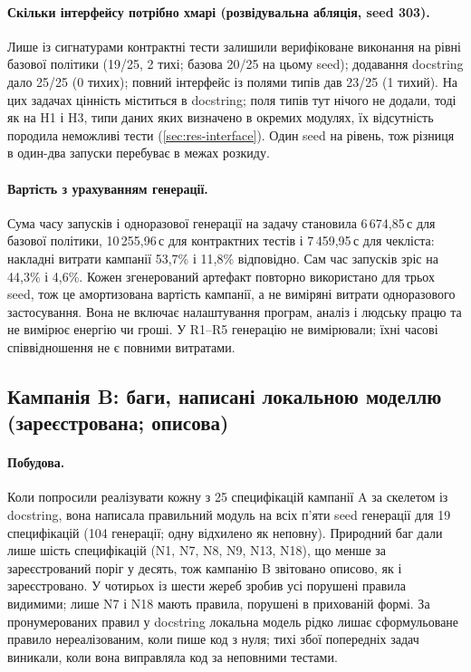 \documentclass[11pt]{article}
\begin{document}
\paragraph{Скільки інтерфейсу потрібно хмарі (розвідувальна абляція, seed 303).} Лише із сигнатурами контрактні тести залишили верифіковане виконання на рівні базової політики (19/25, 2 тихі; базова 20/25 на цьому seed); додавання docstring дало 25/25 (0 тихих); повний інтерфейс із полями типів дав 23/25 (1 тихий). На цих задачах цінність міститься в docstring; поля типів тут нічого не додали, тоді як на H1 і H3, типи даних яких визначено в окремих модулях, їх відсутність породила неможливі тести (\cref{sec:res-interface}). Один seed на рівень, тож різниця в один-два запуски перебуває в межах розкиду.

\paragraph{Вартість з урахуванням генерації.} Сума часу запусків і одноразової генерації на задачу становила 6\,674{,}85\,с для базової політики, 10\,255{,}96\,с для контрактних тестів і 7\,459{,}95\,с для чекліста: накладні витрати кампанії 53{,}7\% і 11{,}8\% відповідно. Сам час запусків зріс на 44{,}3\% і 4{,}6\%. Кожен згенерований артефакт повторно використано для трьох seed, тож це амортизована вартість кампанії, а не виміряні витрати одноразового застосування. Вона не включає налаштування програм, аналіз і людську працю та не вимірює енергію чи гроші. У R1--R5 генерацію не вимірювали; їхні часові співвідношення не є повними витратами.

\subsection{Кампанія B: баги, написані локальною моделлю (зареєстрована; описова)}\label{sec:res-b}
\paragraph{Побудова.} Коли  попросили реалізувати кожну з 25 специфікацій кампанії A за скелетом із docstring, вона написала правильний модуль на всіх п'яти seed генерації для 19 специфікацій (104 генерації; одну відхилено як неповну). Природний баг дали лише шість специфікацій (N1, N7, N8, N9, N13, N18), що менше за зареєстрований поріг у десять, тож кампанію B звітовано описово, як і зареєстровано. У чотирьох із шести жереб зробив усі порушені правила видимими; лише N7 і N18 мають правила, порушені в прихованій формі. За пронумерованих правил у docstring локальна модель рідко лишає сформульоване правило нереалізованим, коли пише код з нуля; тихі збої попередніх задач виникали, коли вона виправляла код за неповними тестами.
\end{document}

